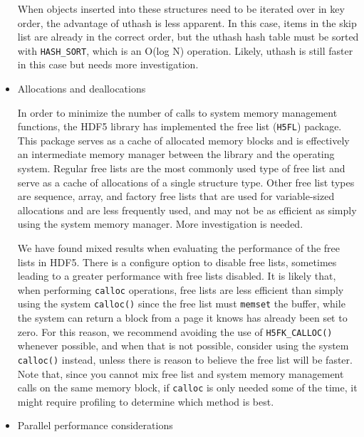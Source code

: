 \begin{itemize}
When objects inserted into these structures need to be iterated over in key order, the advantage of uthash is less apparent. In this case, items in the skip list are already in the correct order, but the uthash hash table must be sorted with \texttt{HASH\_SORT}, which is an O(log N) operation. Likely, uthash is still faster in this case but needs more investigation.

    \item Allocations and deallocations

In order to minimize the number of calls to system memory management functions, the HDF5 library has implemented the free list (\texttt{H5FL}) package. This package serves as a cache of allocated memory blocks and is effectively an intermediate memory manager between the library and the operating system. Regular free lists are the most commonly used type of free list and serve as a cache of allocations of a single structure type. Other free list types are sequence, array, and factory free lists that are used for variable-sized allocations and are less frequently used, and may not be as efficient as simply using the system memory manager. More investigation is needed.

We have found mixed results when evaluating the performance of the free lists in HDF5. There is a configure option to disable free lists, sometimes leading to a greater performance with free lists disabled. It is likely that, when performing \texttt{calloc} operations, free lists are less efficient than simply using the system \texttt{calloc()} since the free list must \texttt{memset} the buffer, while the system can return a block from a page it knows has already been set to zero. For this reason, we recommend avoiding the use of \texttt{H5FK\_CALLOC()} whenever possible, and when that is not possible, consider using the system \texttt{calloc()} instead, unless there is reason to believe the free list will be faster. Note that, since you cannot mix free list and system memory management calls on the same memory block, if \texttt{calloc} is only needed some of the time, it might require profiling to determine which method is best.

    \item Parallel performance considerations


\end{itemize}
